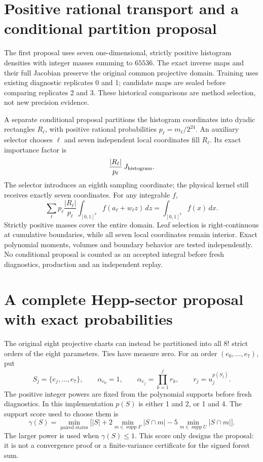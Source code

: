 \documentclass[11pt]{article}
\begin{document}
\section*{Positive rational transport and a conditional partition proposal}
The first proposal uses seven one-dimensional, strictly positive histogram
densities with integer masses summing to $65536$. The exact inverse maps
and their full Jacobian preserve the original common projective domain.
Training uses existing diagnostic replicates 0 and 1; candidate maps are
sealed before comparing replicates 2 and 3. These historical comparisons
are method selection, not new precision evidence.

A separate conditional proposal partitions the histogram coordinates into
dyadic rectangles $R_\ell$, with positive rational probabilities
$p_\ell=m_\ell/2^{24}$. An auxiliary selector chooses $\ell$ and seven
independent local coordinates fill $R_\ell$. Its exact importance factor is
\[
 \frac{|R_\ell|}{p_\ell}\,J_{\rm histogram}.
\]
The selector introduces an eighth sampling coordinate; the physical kernel
still receives exactly seven coordinates. For any integrable $f$,
\[
 \sum_\ell p_\ell\frac{|R_\ell|}{p_\ell}
       \int_{[0,1]^7}f(a_\ell+w_\ell z)\,dz
 =\int_{[0,1]^7}f(x)\,dx.
\]
Strictly positive masses cover the entire domain. Leaf selection is
right-continuous at cumulative boundaries, while all seven local coordinates
remain interior. Exact polynomial moments, volumes and boundary behavior
are tested independently. No conditional proposal is counted as an accepted
integral before fresh diagnostics, production and an independent replay.
\section*{A complete Hepp-sector proposal with exact probabilities}
The original eight projective charts can instead be partitioned into all
$8!$ strict orders of the eight parameters. Ties have measure zero.
For an order $(e_0,\ldots,e_7)$, put
\[
 S_j=\{e_j,\ldots,e_7\},\qquad
 \alpha_{e_0}=1,\qquad
 \alpha_{e_j}=\prod_{k=1}^{j}r_k,\qquad r_j=u_j^{p(S_j)}.
\]
The positive integer powers are fixed from the polynomial supports before
fresh diagnostics. In this implementation $p(S)$ is either 1 and 2, or
1 and 4. The support score used to choose them is
\[
 \gamma(S)=\min_{\text{paired states}}
 \bigl[|S|+2\min_{m\in\operatorname{supp}F}|S\cap m|
             -5\min_{m\in\operatorname{supp}U}|S\cap m|\bigr].
\]
The larger power is used when $\gamma(S)\leq1$.
This score only designs the proposal: it is not a convergence proof or
a finite-variance certificate for the signed forest sum.
\end{document}
